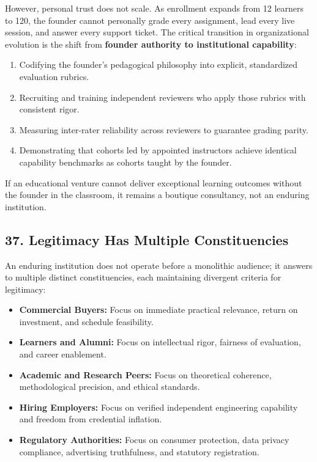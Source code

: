 However, personal trust does not scale. As enrollment expands from 12 learners to 120, the founder cannot personally grade every assignment, lead every live session, and answer every support ticket. The critical transition in organizational evolution is the shift from \textbf{founder authority to institutional capability}:
\begin{enumerate}
\item Codifying the founder's pedagogical philosophy into explicit, standardized evaluation rubrics.
\item Recruiting and training independent reviewers who apply those rubrics with consistent rigor.
\item Measuring inter-rater reliability across reviewers to guarantee grading parity.
\item Demonstrating that cohorts led by appointed instructors achieve identical capability benchmarks as cohorts taught by the founder.
\end{enumerate}

If an educational venture cannot deliver exceptional learning outcomes without the founder in the classroom, it remains a boutique consultancy, not an enduring institution.

\subsection*{37. Legitimacy Has Multiple Constituencies}

An enduring institution does not operate before a monolithic audience; it answers to multiple distinct constituencies, each maintaining divergent criteria for legitimacy:
\begin{itemize}
\item \textbf{Commercial Buyers:} Focus on immediate practical relevance, return on investment, and schedule feasibility.
\item \textbf{Learners and Alumni:} Focus on intellectual rigor, fairness of evaluation, and career enablement.
\item \textbf{Academic and Research Peers:} Focus on theoretical coherence, methodological precision, and ethical standards.
\item \textbf{Hiring Employers:} Focus on verified independent engineering capability and freedom from credential inflation.
\item \textbf{Regulatory Authorities:} Focus on consumer protection, data privacy compliance, advertising truthfulness, and statutory registration.
\end{itemize}

